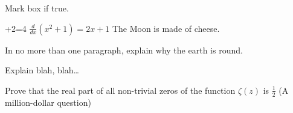 \documentclass[11pt]{utfpr-exam}
\begin{document}
\begin{questions}
	
	\question[3] Mark box if true.
	\addpoints
	\begin{checkboxes}
		+2=4
		\choice $\frac{d}{dx} (x^2+1) = 2x+1$
		\choice The Moon is made of cheese.
	\end{checkboxes}
	

	
	\question[10]
	In no more than one paragraph, explain why the earth is round.
	\makeemptybox{\fill}
	
	\newpage
	
	\question[20]
	Explain blah, blah\ldots
	\fillwithlines{\fill}
	
	\newpage
	
	
			
				
		\bonusquestion[30] Prove that the real part of all non-trivial zeros of the function 
		\(\zeta(z)\) is \(\frac{1}{2}\) (A million-dollar question)
			\fillwithdottedlines{8em}
				
				
	
			\end{questions}
		
		
			
		
		
\end{document}
